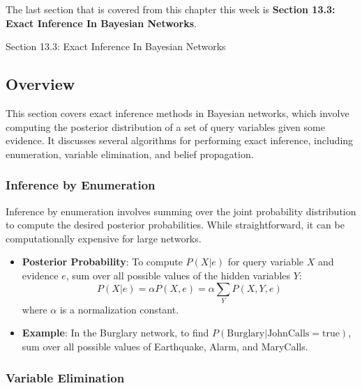 The last section that is covered from this chapter this week is \textbf{Section 13.3: Exact Inference In Bayesian Networks}.

\begin{notes}{Section 13.3: Exact Inference In Bayesian Networks}
    \subsection*{Overview}

    This section covers exact inference methods in Bayesian networks, which involve computing the posterior distribution of a set of query variables given some evidence. It discusses several algorithms 
    for performing exact inference, including enumeration, variable elimination, and belief propagation.
    
    \subsubsection*{Inference by Enumeration}
    
    Inference by enumeration involves summing over the joint probability distribution to compute the desired posterior probabilities. While straightforward, it can be computationally expensive for large 
    networks.
    
    \begin{highlight}
    
        \begin{itemize}
            \item \textbf{Posterior Probability}: To compute $P(X | e)$ for query variable $X$ and evidence $e$, sum over all possible values of the hidden variables $Y$:
            \[
            P(X | e) = \alpha P(X, e) = \alpha \sum_{Y} P(X, Y, e)
            \]
            where $\alpha$ is a normalization constant.
            \item \textbf{Example}: In the Burglary network, to find $P(\text{Burglary} | \text{JohnCalls} = \text{true})$, sum over all possible values of Earthquake, Alarm, and MaryCalls.
        \end{itemize}
    
    \end{highlight}
    
    \subsubsection*{Variable Elimination}
    

\end{notes}
